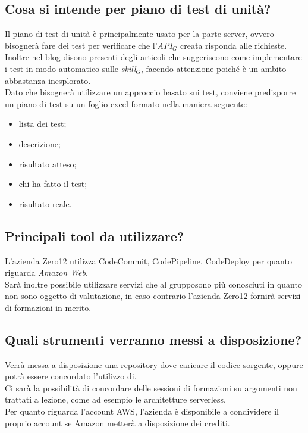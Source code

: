 \documentclass[a4paper,12pt]{article}
\begin{document}
	\subsection{Cosa si intende per piano di test di unità?}
	Il piano di test di unità è principalmente usato per la parte server, ovvero bisognerà fare dei test per verificare che l'\textit{API$_{G}$} creata risponda alle richieste. \\
	Inoltre nel blog disono presenti degli articoli che suggeriscono come implementare i test in modo  automatico sulle \textit{skill$_{G}$}, facendo attenzione poiché è un ambito abbastanza inesplorato. \\
	Dato che bisognerà utilizzare un approccio basato sui test, conviene predisporre un piano di test su un foglio excel formato nella maniera seguente:
	\begin{itemize}
		\item lista dei test;
		\item descrizione;
		\item risultato atteso;
		\item chi ha fatto il test;
		\item risultato reale.
	\end{itemize}

	\subsection{Principali tool da utilizzare?}
	L'azienda Zero12 utilizza CodeCommit, CodePipeline, CodeDeploy per quanto riguarda \textit{Amazon Web}. \\
	Sarà inoltre possibile utilizzare servizi che al grupposono più conosciuti in quanto non sono oggetto di valutazione, in caso contrario l'azienda Zero12 fornirà servizi di formazioni in merito.

	\subsection{Quali strumenti verranno messi a disposizione?}
	Verrà messa a disposizione una repository dove caricare il codice sorgente, oppure potrà essere concordato l'utilizzo di. \\
	Ci sarà la possibilità di concordare delle sessioni di formazioni su argomenti non trattati a lezione, come ad esempio le architetture serverless. \\
	Per quanto riguarda l'account AWS, l'azienda è disponibile a condividere il proprio account se Amazon metterà a disposizione dei crediti.
	\label{LastPage}
\end{document}
